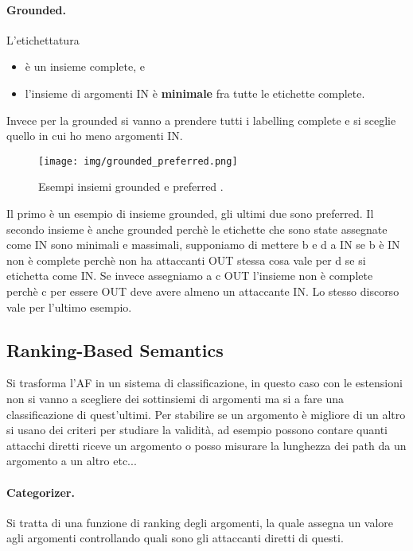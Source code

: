 \paragraph{Grounded.}
L'etichettatura
\begin{itemize}
    \item è un insieme complete, e 
    \item l'insieme di argomenti IN è \textbf{minimale} fra tutte le etichette complete.
\end{itemize}
Invece per la grounded si vanno a prendere tutti i labelling complete e si sceglie quello in cui ho meno argomenti IN.

\begin{figure}[H]
    \centering
    \texttt{[image: img/grounded\_preferred.png]}
    \caption{Esempi insiemi grounded e preferred .}\label{fig:es_grounded_preferred}
\end{figure}
Il primo è un esempio di insieme grounded, gli ultimi due sono preferred. Il secondo insieme è anche grounded perchè le etichette che sono state assegnate come IN sono minimali e massimali, supponiamo di mettere b e d a IN se b è IN non è complete perchè non ha attaccanti OUT stessa cosa vale per d se si etichetta come IN. Se invece assegniamo a c OUT l'insieme non è complete perchè c per essere OUT deve avere almeno un attaccante IN. Lo stesso discorso vale per l'ultimo esempio.
\subsection{Ranking-Based Semantics}
Si trasforma l'AF in un sistema di classificazione, in questo caso con le estensioni non si vanno a scegliere dei sottinsiemi di argomenti ma si a fare una classificazione di quest'ultimi. Per stabilire se un argomento è migliore di un altro si usano dei criteri per studiare la validità, ad esempio possono contare quanti attacchi diretti riceve un argomento o posso misurare la lunghezza dei path da un argomento a un altro etc... 

\paragraph{Categorizer.} Si tratta di una funzione di ranking degli argomenti, la quale assegna un valore agli argomenti controllando quali sono gli attaccanti diretti di questi.

